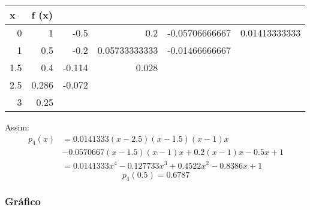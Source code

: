 \documentclass[12pt]{article}
\begin{document}
\begin{table}[H]
	\begin{tabular}{@{}rrrlll@{}}
		\toprule
		\multicolumn{1}{l}{x} & \multicolumn{1}{l}{f (x)} & \multicolumn{1}{l}{} &                                   &                                    &                                   \\ \midrule
		0                     & 1                         & -0.5                 & \multicolumn{1}{r}{0.2}           & \multicolumn{1}{r}{-0.05706666667} & \multicolumn{1}{r}{0.01413333333} \\
		1                     & 0.5                       & -0.2                 & \multicolumn{1}{r}{0.05733333333} & \multicolumn{1}{r}{-0.01466666667} &                                   \\
		1.5                   & 0.4                       & -0.114               & \multicolumn{1}{r}{0.028}         &                                    &                                   \\
		2.5                   & 0.286                     & -0.072               &                                   &                                    &                                   \\
		3                     & 0.25                      & \multicolumn{1}{l}{} &                                   &                                    &                                   \\ \bottomrule
	\end{tabular}
\end{table}

Assim:
\begin{align*}
	p_4(x)
	 & = 0.0141333(x-2.5)(x-1.5)(x-1)x                        \\
	 & - 0.0570667(x-1.5)(x-1)x + 0.2(x-1)x - 0.5x + 1        \\
	 & = 0.0141333x^4 - 0.127733x^3 + 0.4522x^2 - 0.8386x + 1
\end{align*}
\[\boxed{p_4(0.5) = 0.6787}\]

\subsubsection{Gráfico}
\end{document}

